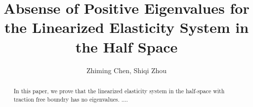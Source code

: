 \documentclass[12pt]{iopart}
\begin{document}
	
	
	\def\debproof{\noindent {\bf Proof.} }
	\def\finproof{\hfill {\small $\Box$} \\}
	\makeatletter %
	\makeatother  %
	\renewcommand\theequation{{\thesection}.{\arabic{equation}}}
	
\title[]{Absense of Positive Eigenvalues for the Linearized Elasticity System in the Half Space}
\author{ Zhiming Chen, Shiqi Zhou }
\address{LSEC, Institute of Computational Mathematics, Academy of
	Mathematics and Systems Science, Chinese Academy of Sciences,
	Beijing 100190, China}

\begin{abstract}
	In this paper, we prove that the linearized elasticity system in the half-space with traction free boundry has no eigenvalues. ....
\end{abstract}
	\maketitle
	\newcommand{\eps}{\varepsilon}
	\newcommand{\RR}{\mathcal{R}}
	\newtheorem{lem}{Lemma}[section]
	\newtheorem{prop}{Proposition}[section]
	\newtheorem{cor}{Corollary}[section]
	\newtheorem{thm}{Theorem}[section]
	\newtheorem{rem}{Remark}[section]
	\newtheorem{alg}{Algorithm}[section]
	\newtheorem{assum}{Assumption}[section]
	\newtheorem{definition}{Definition}[section]
	
	
	\newcommand{\MyRoman}[1]{\rm\setcounter{RomanNumber}{#1}\Roman{RomanNumber}}
	
\end{document}
